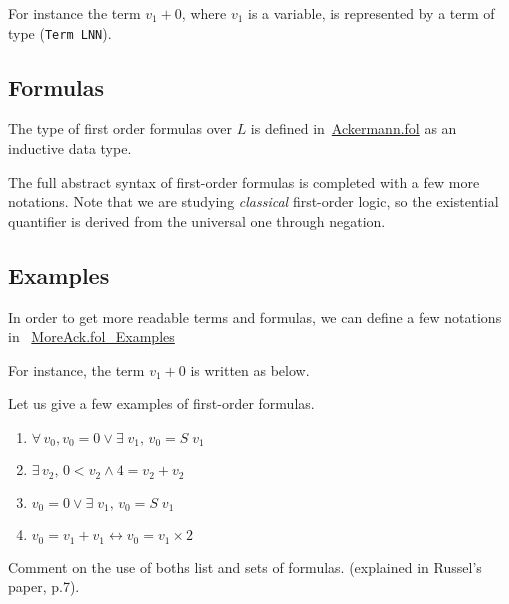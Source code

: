 For instance the term $v_1+0$, where $v_1$ is a variable,
is represented by a term of type (\texttt{Term LNN}).


\subsection{Formulas}



The type of first order formulas over $L$ is defined 
in~\href{../theories/html/hydras.Ackermann.fol.html}{Ackermann.fol} as an inductive data type.


The full abstract syntax of first-order formulas is completed 
with a few more notations. Note that we are studying \emph{classical} first-order logic, so the existential quantifier is derived from the universal one through negation. 


\subsection{Examples}

In order to get more readable terms and formulas, we can define a few notations in ~\href{../theories/html/hydras.MoreAck.fol_Examples.html}{MoreAck.fol\_Examples}



For instance, the term $v_1+0$ is written as below.


Let us give a few examples of first-order formulas.

\label{fol:examplesf1f2f3}
\begin{enumerate}
\item $\forall\,v_0, v_0=0 \vee \exists\;v_1,\, v_0= S\;v_1$
\item $\exists\,v_2,\, 0< v_2 \wedge 4=v_2+v_2$
\item $ v_0=0 \vee \exists\;v_1,\, v_0= S\;v_1$
\item $v_0= v_1 + v_1 \leftrightarrow v_0 = v_1 \times 2$
\end{enumerate}


\begin{todo}
Comment on the use of boths list and sets of formulas.
(explained in Russel's paper, p.7).


\end{todo}


